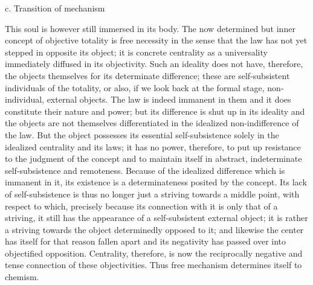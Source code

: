c. Transition of mechanism

This soul is however still immersed in its body.
The now determined but inner concept of objective totality is
free necessity in the sense that the
law has not yet stepped in opposite its object;
it is concrete centrality as
a universality immediately diffused in its objectivity.
Such an ideality does
not have, therefore, the objects themselves for its determinate difference;
these are self-subsistent individuals of the totality,
or also, if we look back
at the formal stage, non-individual, external objects.
The law is indeed
immanent in them and it does constitute their nature and power;
but
its difference is shut up in its ideality and the objects are not themselves
differentiated in the idealized non-indifference of the law.
But the object possesses its essential self-subsistence
solely in the idealized centrality and its laws;
it has no power, therefore, to put up resistance to the judgment of the
concept
and to maintain itself in abstract, indeterminate self-subsistence
and remoteness.
Because of the idealized difference which is immanent in it,
its existence is a determinateness posited by the concept.
Its lack of self-subsistence is thus no longer just a striving towards a middle point,
with
respect to which, precisely because its connection with it is only that of a
striving, it still has the appearance of a self-subsistent external object; it is
rather a striving towards the object determinedly opposed to it;
and likewise
the center has itself for that reason fallen apart and its negativity has passed
over into objectified opposition.
Centrality, therefore, is now the reciprocally negative
and tense connection of these objectivities.
Thus free mechanism determines itself to chemism.
